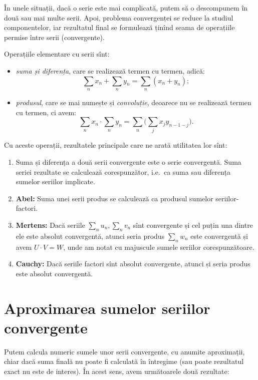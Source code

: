 \documentclass[11pt,a4paper]{article}
\theoremstyle{dotless}
\theoremstyle{dotlessdr}
\begin{document}
În unele situații, dacă o serie este mai complicată, putem să o descompunem
în două sau mai multe serii. Apoi, problema convergenței se reduce la studiul
componentelor, iar rezultatul final se formulează ținînd seama de operațiile
permise între serii (convergente).

Operațiile elementare cu serii sînt:
\begin{itemize}
  \item \emph{suma și diferența}, care se realizează termen cu termen, adică:
    \[
      \sum_n x_n + \sum_n y_n = \sum_n (x_n + y_n);
    \]
  \item \emph{produsul}, care se mai numește și \emph{convoluție}, deoarece nu
    se realizează termen cu termen, ci avem:
    \[
      \sum_n x_n \cdot \sum_n y_n = \sum_n \Big( \sum_j x_j y_{n - 1 - j} \Big).
    \]
\end{itemize}

Cu aceste operații, rezultatele principale care ne arată utilitatea lor sînt:

\begin{enumerate}[(1)]
  \item Suma și diferența a două serii convergente este o serie convergentă. Suma
    seriei rezultate se calculează corespunzător, i.e.\ ca suma sau diferența
    sumelor seriilor implicate.
  \item \textbf{Abel:} Suma unei serii produs se calculează ca produsul sumelor
    seriilor-factori.
  \item \textbf{Mertens:} Dacă seriile $\sum_n u_n, \sum_n v_n$ sînt convergente și
    cel puțin una dintre ele este absolut convergentă, atunci seria produs
    $\sum_n w_n$ este convergentă și avem $U \cdot V = W$, unde am notat cu majuscule
    sumele seriilor corespunzătoare.
  \item \textbf{Cauchy:} Dacă seriile factori sînt absolut convergente, atunci și seria
    produs este absolut convergentă.
\end{enumerate}



\section{Aproximarea sumelor seriilor convergente}

Putem calcula numeric sumele unor serii convergente, cu anumite aproximații,
chiar dacă suma finală nu poate fi calculată în întregime (sau poate rezultatul
exact nu este de interes). În acest sens, avem următoarele două rezultate:
\end{document}
